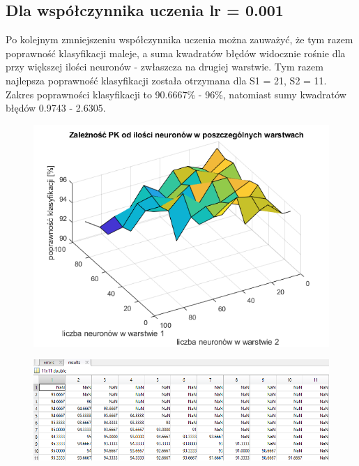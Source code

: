 \documentclass[a4paper, 12pt]{report}
\begin{document}
\subsection{Dla współczynnika uczenia lr = 0.001}
Po kolejnym zmniejszeniu współczynnika uczenia można zauważyć, że tym razem poprawność klasyfikacji maleje, a suma kwadratów błędów widocznie rośnie dla przy większej ilości neuronów - zwłaszcza na drugiej warstwie. Tym razem najlepsza poprawność klasyfikacji została otrzymana dla S1 = 21, S2 = 11. Zakres poprawności klasyfikacji to 90.6667\% - 96\%, natomiast sumy kwadratów błędów 0.9743 - 2.6305.
\begin{figure}[hbt!]
\includegraphics[width=14cm]{lr3 pk}
\centering
\end{figure}
\begin{figure}[hbt!]

\includegraphics[width=14cm]{lr3 pk dane}
\centering
\end{figure}
\end{document}
